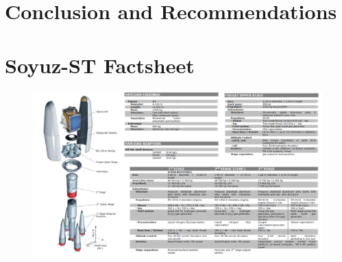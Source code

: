 \documentclass[11pt]{report}
\begin{document}


%
%

\chapter{Conclusion and Recommendations}


%
%




%
%

\appendix
\chapter{Soyuz-ST Factsheet}
\label{appa}
\begin{figure}[ht]
\centering
\includegraphics[scale = 0.4, angle=270]{chapters/img/soyuzfact.png}
\label{fig:soyuzfact}

\end{figure}

\newpage


\newpage


\newpage

\end{document}
